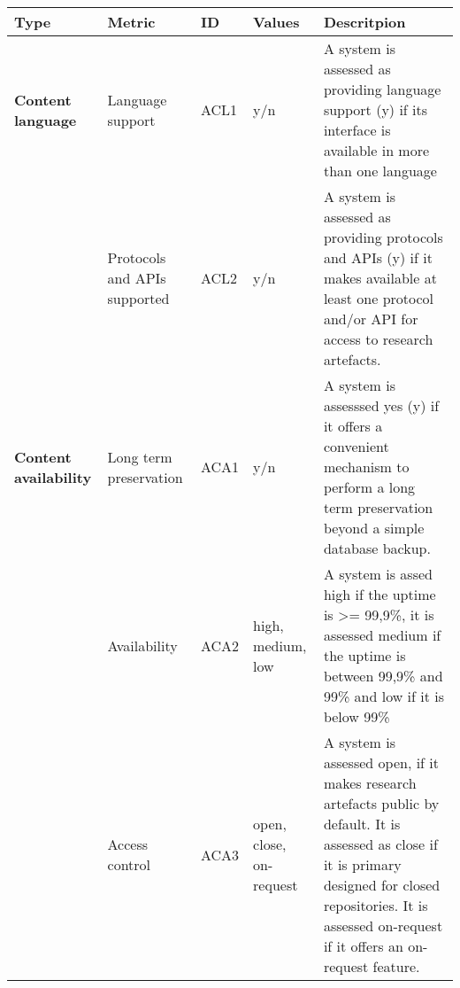 \begin{tabular}{|m{2.5cm}|m{3cm}|m{1cm}|m{1cm}|p{8cm}|}
\hline \textbf{Type}&\textbf{Metric}&\textbf{ID}&\textbf{Values}&\textbf{Descritpion}\\ \hline
\textbf{Content language}&Language support&ACL1&y/n&A system is assessed as providing language support (y) if its interface is available in more than one language\\ \hline
\textbf{}&Protocols and APIs supported&ACL2&y/n&A system is assessed as providing protocols and APIs (y) if it makes available at least one protocol and/or API for access to research artefacts.\\ \hline
\textbf{Content availability}&Long term preservation&ACA1&y/n&A system is assesssed yes (y) if it offers a convenient mechanism to perform a long term preservation beyond a simple database backup.\\ \hline
\textbf{}&Availability&ACA2&high, medium, low&A system is assed high if the uptime is >= 99,9\%, it is assessed medium if the uptime is between 99,9\% and 99\% and low if it is below 99\% \\ \hline
\textbf{}&Access control&ACA3&open, close, on-request&A system is assessed open, if it makes research artefacts public by default. It is assessed as close if it is primary designed for closed repositories. It is assessed on-request if it offers an on-request feature.\\ \hline
\end{tabular}


